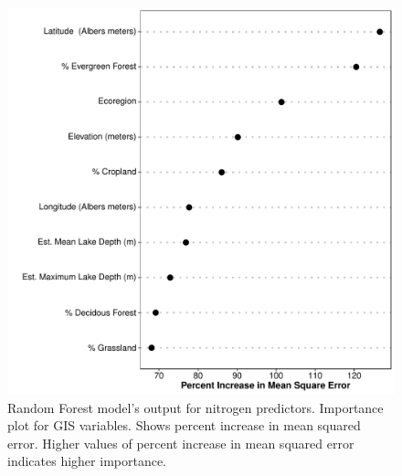 \documentclass[fleqn,10pt,lineno]{wlpeerj} %
\begin{document}
\begin{figure}
  \includegraphics[width=\textwidth]{importanceplot_gis_PTL.pdf}
  \caption{Random Forest model's output for nitrogen predictors. Importance plot for GIS variables. Shows percent increase in mean squared error. Higher values of percent increase in mean squared error indicates higher importance.}
  \label{fig:importancePlot_gis_PTL}
\end{figure}
\end{document}
